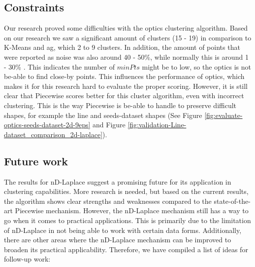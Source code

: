 \subsection{Constraints}
Our research proved some difficulties with the \gls{optics} clustering algorithm.
Based on our research we saw a significant amount of clusters (15 - 19) in comparison to K-Means and \gls{ag}, which 2 to 9 clusters. In addition, the amount of points that were reported as noise was also around 40 - 50\%, while normally this is around 1 - 30\% \citep{schubert_dbscan_2017}. This indicates the number of $minPts$ might be to low, so the \gls{optics} is not be-able to find close-by points. This influences the performance of \gls{optics}, which makes it for this research hard to evaluate the proper scoring. However, it is still clear that Piecewise scores better for this cluster algorithm, even with incorrect clustering. This is the way Piecewise is be-able to handle to preserve difficult shapes, for example the line and seeds-dataset shapes (See Figure \ref{fig:evaluate-optics-seeds-dataset-2d-9eps} and Figure \ref{fig:validation-Line-dataset_comparison_2d-laplace}).

\subsection{Future work}
The results for nD-Laplace suggest a promising future for its application in clustering capabilities. More research is needed, but based on the current results, the algorithm shows clear strengths and weaknesses compared to the state-of-the-art Piecewise mechanism. 
However, the nD-Laplace mechanism still has a way to go when it comes to practical applications. This is primarily due to the limitation of nD-Laplace in not being able to work with certain data forms. Additionally, there are other areas where the nD-Laplace mechanism can be improved to broaden its practical applicability.
Therefore, we have compiled a list of ideas for follow-up work:

